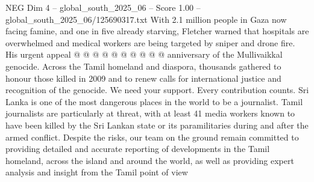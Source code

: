 \begin{textsample}{NEG Dim 4 – global\_south\_2025\_06 – Score 1.00 – global\_south\_2025\_06/125690317.txt}
With 2.1 million people in Gaza now facing famine, and one in five already starving, Fletcher warned that hospitals are overwhelmed and medical workers are being targeted by sniper and drone fire.
His urgent appeal @ @ @ @ @ @ @ @ @ @ anniversary of the Mullivaikkal genocide.
Across the Tamil homeland and diaspora, thousands gathered to honour those killed in 2009 and to renew calls for international justice and recognition of the genocide.
We need your support.
Every contribution counts.
Sri Lanka is one of the most dangerous places in the world to be a journalist.
Tamil journalists are particularly at threat, with at least 41 media workers known to have been killed by the Sri Lankan state or its paramilitaries during and after the armed conflict.
Despite the risks, our team on the ground remain committed to providing detailed and accurate reporting of developments in the Tamil homeland, across the island and around the world, as well as providing expert analysis and insight from the Tamil point of view

\end{textsample}
